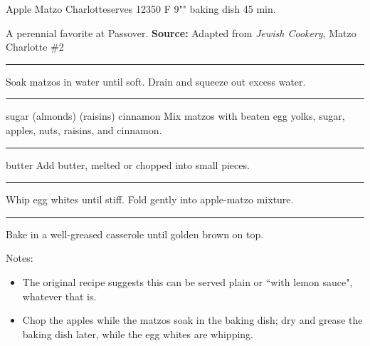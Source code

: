 \documentclass{article}
\begin{document}
\begin{recipe}{Apple Matzo Charlotte}{serves 12}{350\0 F \hfill 9"" baking dish \hfill 45 min.}

  \freeform A perennial favorite at Passover.
  \textbf{Source:} Adapted from \textit{Jewish Cookery}, Matzo Charlotte \#2
  \freeform\rule{\textwidth}{0.05pt}

  Soak matzos in water until soft. Drain and squeeze out excess water.
  \freeform\rule{\textwidth}{0.05pt}

   {sugar}
   {(almonds)}
   {(raisins)}
   {cinnamon}
  Mix matzos with beaten egg yolks, sugar, apples, nuts, raisins, and cinnamon.
  \freeform\rule{\textwidth}{0.05pt}

   {butter}
  Add butter, melted or chopped into small pieces.
  \freeform\rule{\textwidth}{0.05pt}

  Whip egg whites until stiff. Fold gently into apple-matzo mixture.
  \freeform\rule{\textwidth}{0.05pt}

  \newstep Bake in a well-greased casserole until golden brown on top.

  \freeform Notes:
  \begin{itemize}
    \item The original recipe suggests this can be served plain or ``with lemon sauce", whatever that is.
    \item Chop the apples while the matzos soak in the baking dish; dry and grease the baking dish later, while the egg whites are whipping.
  \end{itemize}
\end{recipe}
\end{document}
